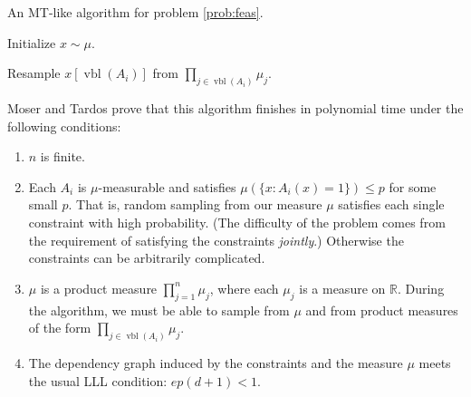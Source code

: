 \documentclass{article}
\newcommand{\hasDist}%
  {\sim}
\newcommand{\Reals}%
  {\mathbb{R}}
\begin{document}
\begin{algorithm}[H]
\caption{An MT-like algorithm for problem \ref{prob:feas}.}
\label{alg:mt-feas}
\begin{algorithmic}[1]

\State Initialize $x \hasDist \mu$.
\EndFor

    \Return
  \EndIf
  \State Resample $x[\operatorname{vbl}(A_i)]$ from $\prod_{j \in \operatorname{vbl}(A_i)} \mu_j$.
  \EndFor
\EndFunction

\end{algorithmic}
\end{algorithm}

Moser and Tardos prove that this algorithm finishes in polynomial time under the following conditions:

\begin{enumerate}
  \item $n$ is finite. \label{eqn:feas-finitedim-condition}
  \item Each $A_i$ is $\mu$-measurable and satisfies $\mu(\{x: A_i(x) = 1\}) \leq p$ for some small $p$.  That is, random sampling from our measure $\mu$ satisfies each single constraint with high probability.  (The difficulty of the problem comes from the requirement of satisfying the constraints \emph{jointly}.)  Otherwise the constraints can be arbitrarily complicated.  \label{eqn:feas-margprob-condition}
  \item $\mu$ is a product measure $\prod_{j=1}^{n} \mu_j$, where each $\mu_j$ is a measure on $\Reals$.  During the algorithm, we must be able to sample from $\mu$ and from product measures of the form $\prod_{j \in \operatorname{vbl}(A_i)} \mu_j$.  \label{eqn:feas-prodmeasure-condition}
  \item The dependency graph induced by the constraints and the measure $\mu$ meets the usual LLL condition: $e p (d+1) < 1$. \label{eqn:feas-lowdep-condition}
\end{enumerate}
\end{document}
